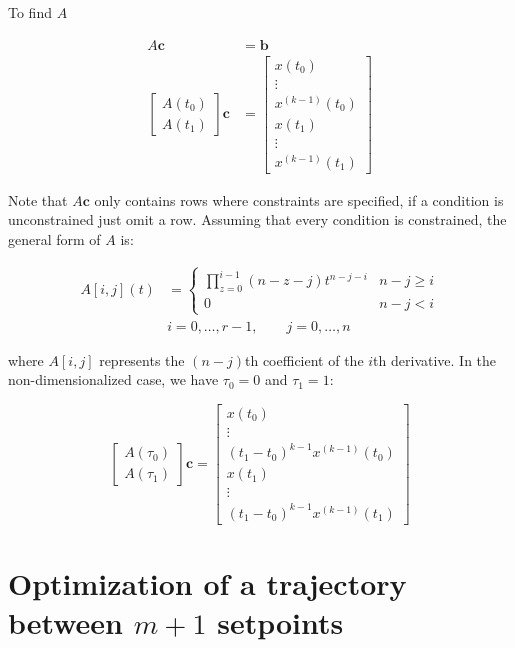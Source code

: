 \noindent To find $A$

\begin{align*}
	A\mathbf{c} &= \mathbf{b} \\
	\begin{bmatrix}
		A(t_0) \\
		A(t_1) 
	\end{bmatrix}
	\mathbf{c} &=
	\begin{bmatrix}
		x(t_0) \\
		\vdots \\
		x^{(k-1)}(t_0) \\
		x(t_1) \\
		\vdots \\
		x^{(k-1)}(t_1)
	\end{bmatrix}
\end{align*}

\noindent Note that $A\mathbf{c}$ only contains rows where constraints are specified, if a condition is unconstrained just omit a row. Assuming that every condition is constrained, the general form of $A$ is:

\begin{align}
	A[i,j](t) &= 
	\begin{cases}
		\prod\limits_{z=0}^{i-1}(n-z-j)t^{n-j-i} & n-j \ge i \\
		0 & n-j<i
	\end{cases} \label{eq:matrixA} \\
	& i=0,\dots,r-1, \qquad j=0,\dots,n \nonumber
\end{align}

\noindent where $A[i,j]$ represents the $(n-j)$th coefficient of the $i$th derivative. In the non-dimensionalized case, we have $\tau_0=0$ and $\tau_1=1$:

\begin{equation}
	\begin{bmatrix}
		A(\tau_0) \\
		A(\tau_1) 
	\end{bmatrix}
	\mathbf{c} =
	\begin{bmatrix}
		x(t_0) \\
		\vdots \\
		(t_1-t_0)^{k-1}x^{(k-1)}(t_0) \\
		x(t_1) \\
		\vdots \\
		(t_1-t_0)^{k-1}x^{(k-1)}(t_1)
	\end{bmatrix}
\end{equation}


\section{Optimization of a trajectory between $m+1$ setpoints}


